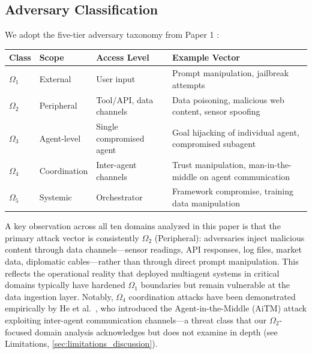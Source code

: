 \documentclass[
]{article}
\newcounter{none} %
\begin{document}
\subsection{Adversary Classification}\label{adversary-classification}

We adopt the five-tier adversary taxonomy from Paper 1
\cite{friedman2026cogsec1}:

{\def\LTcaptype{none} %
\begin{longtable}[]{@{}
  >{\raggedright\arraybackslash}p{}
  >{\raggedright\arraybackslash}p{}
  >{\raggedright\arraybackslash}p{}
  >{\raggedright\arraybackslash}p{}@{}}
\toprule\noalign{}
\begin{minipage}[b]{\linewidth}\raggedright
Class
\end{minipage} & \begin{minipage}[b]{\linewidth}\raggedright
Scope
\end{minipage} & \begin{minipage}[b]{\linewidth}\raggedright
Access Level
\end{minipage} & \begin{minipage}[b]{\linewidth}\raggedright
Example Vector
\end{minipage} \\
\midrule\noalign{}
\endhead
\bottomrule\noalign{}
\endlastfoot
\(\Omega_1\) & External & User input & Prompt manipulation, jailbreak
attempts \\
\(\Omega_2\) & Peripheral & Tool/API, data channels & Data poisoning,
malicious web content, sensor spoofing \\
\(\Omega_3\) & Agent-level & Single compromised agent & Goal hijacking
of individual agent, compromised subagent \\
\(\Omega_4\) & Coordination & Inter-agent channels & Trust manipulation,
man-in-the-middle on agent communication \\
\(\Omega_5\) & Systemic & Orchestrator & Framework compromise, training
data manipulation \\
\end{longtable}
}

A key observation across all ten domains analyzed in this paper is that
the primary attack vector is consistently \(\Omega_2\) (Peripheral):
adversaries inject malicious content through data channels---sensor
readings, API responses, log files, market data, diplomatic
cables---rather than through direct prompt manipulation. This reflects
the operational reality that deployed multiagent systems in critical
domains typically have hardened \(\Omega_1\) boundaries but remain
vulnerable at the data ingestion layer. Notably, \(\Omega_4\)
coordination attacks have been demonstrated empirically by He et
al.~\cite{he2025redteaming}, who introduced the Agent-in-the-Middle
(AiTM) attack exploiting inter-agent communication channels---a threat
class that our \(\Omega_2\)-focused domain analysis acknowledges but
does not examine in depth (see Limitations,
\cref{sec:limitations_discussion}).
\end{document}
